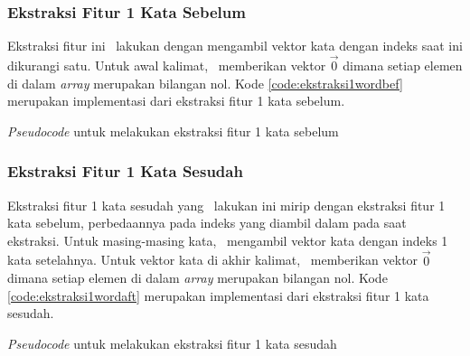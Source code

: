 \subsubsection{Ekstraksi Fitur 1 Kata Sebelum}
Ekstraksi fitur ini \saya~lakukan dengan mengambil vektor kata dengan indeks saat ini dikurangi satu. Untuk awal kalimat, \saya~memberikan vektor $ \vec{0} $ dimana setiap elemen di dalam \textit{array} merupakan bilangan nol. Kode \ref{code:ekstraksi1wordbef} merupakan implementasi dari ekstraksi fitur 1 kata sebelum.

\begin{kode}	
	
	\SetAlgoLined
	
	\BlankLine
	
	\caption{\textit{Pseudocode} untuk melakukan ekstraksi fitur 1 kata sebelum}
	\label{code:ekstraksi1wordbef}	
\end{kode}

\subsubsection{Ekstraksi Fitur 1 Kata Sesudah}
Ekstraksi fitur 1 kata sesudah yang \saya~lakukan ini mirip dengan ekstraksi fitur 1 kata sebelum, perbedaannya pada indeks yang diambil dalam pada saat ekstraksi. Untuk masing-masing kata, \saya~mengambil vektor kata dengan indeks 1 kata setelahnya. Untuk vektor kata di akhir kalimat, \saya~memberikan vektor $ \vec{0} $ dimana setiap elemen di dalam \textit{array} merupakan bilangan nol. Kode \ref{code:ekstraksi1wordaft} merupakan implementasi dari ekstraksi fitur 1 kata sesudah.

\begin{kode}
	
	
	\SetAlgoLined
	
	\BlankLine	
	\caption{\textit{Pseudocode} untuk melakukan ekstraksi fitur 1 kata sesudah}
	\label{code:ekstraksi1wordaft}
\end{kode}

